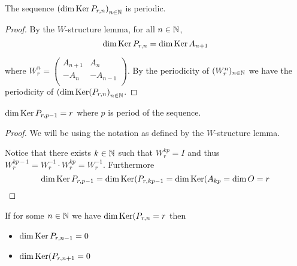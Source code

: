 \begin{proposition}
  The sequence $\left(\dim \operatorname{Ker} P_{r,n}\right)_{n\in\mathbb{N}}$
  is periodic.
\end{proposition}

\begin{proof}
  By the $W$-structure lemma, for all $n\in\mathbb{N}$,
  \[
  \dim\operatorname{Ker} P_{r,n}
  =
  \dim\operatorname{Ker} A_{n+1}
  \]

  where $W_{r}^{n}=\left(\begin{smallmatrix} A_{n+1} & A_{n}  \\ -A_{n} & -A_{n-1} \\\end{smallmatrix}\right)$.
  By the periodicity of $(W_{r}^{n})_{n\in\mathbb{N}}$ we have the
  periodicity of
  $\left(\dim\operatorname{Ker}(P_{r,n}\right)_{n\in\mathbb{N}}$.
\end{proof}

\begin{lemma}
  $\dim\operatorname{Ker} P_{r,p-1} = r$ where $p$ is period of the sequence.
\end{lemma}

\begin{proof}
  We will be using the notation as defined by the $W$-structure lemma.

  Notice that there exists $k\in\mathbb{N}$ such that $W_{r}^{kp} = I$ and
  thus $W_{r}^{kp-1} = W_{r}^{-1} \cdot W_{r}^{kp} = W_{r}^{-1}$.
  Furthermore
  \[
  \dim\operatorname{Ker} P_{r,p-1}
  =
  \dim\operatorname{Ker}(P_{r,kp-1}
  =
  \dim\operatorname{Ker}(A_{kp} = \dim O
  = r
  \]
\end{proof}

\begin{lemma}
  If for some $n\in\mathbb{N}$ we have $\dim\operatorname{Ker}(P_{r,n} = r$ then
  \begin{itemize}
    \item $\dim\operatorname{Ker} P_{r,n-1} = 0$
    \item $\dim\operatorname{Ker}(P_{r,n+1} = 0$
  \end{itemize}
\end{lemma}


